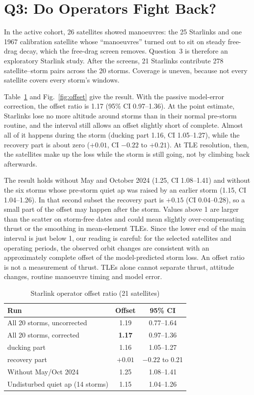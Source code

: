 \section{Q3: Do Operators Fight Back?}
\label{sec:q3}

In the active cohort, 26 satellites showed manoeuvres: the 25 Starlinks and one 1967
calibration satellite whose ``manoeuvres'' turned out to sit on steady free-drag decay, which the
free-drag screen removes. Question~3 is therefore an exploratory Starlink study. After the
screens, 21 Starlinks contribute 278 satellite--storm pairs across the 20 storms. Coverage is uneven, because not every
satellite covers every storm's windows.

Table~\ref{tab:q3} and Fig.~\ref{fig:offset} give the result. With the passive model-error
correction, the offset ratio is 1.17 (95\% CI 0.97--1.36). At the point estimate, Starlinks lose
no more altitude around storms than in their normal pre-storm routine, and the interval still
allows an offset slightly short of complete. Almost all of it happens during the storm (ducking
part 1.16, CI 1.05--1.27), while the recovery part is about zero ($+0.01$, CI $-0.22$ to
$+0.21$). At TLE resolution, then, the satellites make up the loss while the storm is still
going, not by climbing back afterwards.

The result holds without May and October 2024 (1.25, CI 1.08--1.41) and without the six storms
whose pre-storm quiet ap was raised by an earlier storm (1.15, CI 1.04--1.26). In that second
subset the recovery part is $+0.15$ (CI 0.04--0.28), so a small part of the offset may happen
after the storm. Values above 1 are larger than the scatter on storm-free dates and could mean
slightly over-compensating thrust or the smoothing in mean-element TLEs. Since the lower end of
the main interval is just below 1, our reading is careful: for the selected satellites and
operating periods, the observed orbit changes are consistent with an approximately complete
offset of the model-predicted storm loss. An offset ratio is not a measurement of thrust. TLEs
alone cannot separate thrust, attitude changes, routine manoeuvre timing and model error.

\begin{table}[t]
\caption{Starlink operator offset ratio (21 satellites)}
\label{tab:q3}
\centering
\small
\begin{tabular}{@{}lcc@{}}
\toprule
Run & Offset & 95\% CI \\
\midrule
All 20 storms, uncorrected & 1.19 & 0.77--1.64 \\
All 20 storms, corrected & \textbf{1.17} & 0.97--1.36 \\
\quad ducking part & 1.16 & 1.05--1.27 \\
\quad recovery part & $+0.01$ & $-0.22$ to 0.21 \\
Without May/Oct 2024 & 1.25 & 1.08--1.41 \\
Undisturbed quiet ap (14 storms) & 1.15 & 1.04--1.26 \\
\bottomrule
\end{tabular}
\end{table}

